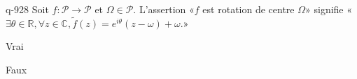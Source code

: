 \begin{truefalse}{q-928}
Soit $f:\mathcal P\to \mathcal P$ et $\Omega\in\mathcal P$. L'assertion «$f$ est rotation de centre $\Omega$» signifie «$\exists \theta\in\mathbb R, \forall z\in\mathbb C, \tilde f(z)=e^{i\theta}(z-\omega)+\omega$.»
\item* Vrai
\item Faux
\end{truefalse}

